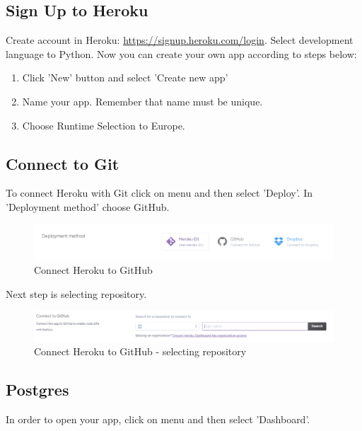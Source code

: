 \documentclass[12pt,a4paper]{article}
\begin{document}
\subsection{Sign Up to Heroku}
Create account in Heroku: \url{https://signup.heroku.com/login}. Select development language to Python. 
Now you can create your own app according to steps below:

\begin{enumerate}
	\item Click 'New' button and select 'Create new app'
	\item Name your app. Remember that name must be unique.
	\item Choose Runtime Selection to Europe. 
\end{enumerate}

\subsection{Connect to Git}
To connect Heroku with Git click on menu and then select 'Deploy'. In 'Deployment method' choose GitHub.
\begin{figure}[H]
	\centering
	\includegraphics[width = 1 \textwidth]{images/git.PNG}
	\caption{Connect Heroku to GitHub}
	\label{fig:git}
\end{figure}

Next step is selecting repository.

\begin{figure}[H]
	\centering
	\includegraphics[width = 1 \textwidth]{images/git2.PNG}
	\caption{Connect Heroku to GitHub - selecting repository}
	\label{fig:git2}
\end{figure}


\subsection{Postgres}
In order to open your app, click on menu and then select 'Dashboard'.\\
\end{document}
